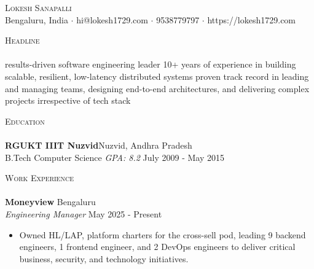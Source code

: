 \documentclass[10pt,a4paper]{article}
\newcommand{\lineunder} {
    \vspace*{-8pt} \\
    \hspace*{-18pt} \hrulefill \\
}
\newcommand{\header} [1] {
    {\hspace*{-18pt}\vspace*{6pt} \textsc{#1}}
    \vspace*{-6pt} \lineunder
}
\begin{document}
\vspace*{-40pt}

    

\vspace*{-10pt}
\begin{center}
	{\Huge \scshape {Lokesh Sanapalli}}\\
	Bengaluru, India $\cdot$ hi@lokesh1729.com $\cdot$ 9538779797 $\cdot$ https://lokesh1729.com\\
\end{center}

\header{Headline}
results-driven software engineering leader \textbar{} 10+ years of experience in building scalable, resilient, low-latency distributed systems \textbar{} proven track record in leading and managing teams, designing end-to-end architectures, and delivering complex projects irrespective of tech stack\\
\vspace*{2mm}

\header{Education}
\textbf{RGUKT IIIT Nuzvid}\hfill Nuzvid, Andhra Pradesh\\
B.Tech Computer Science \textit{GPA: 8.2} \hfill July 2009 - May 2015\\
\vspace{2mm}

\header{Work Experience}
\vspace{1mm}
\textbf{Moneyview} \hfill Bengaluru\\
\textit{Engineering Manager} \hfill May 2025 - Present\\
\vspace{-1mm}
\begin{itemize} \itemsep 1pt
    \item Owned HL/LAP, platform charters for the cross-sell pod, leading 9 backend engineers, 1 frontend engineer, and 2 DevOps engineers to deliver critical business, security, and technology initiatives.
\end{itemize}
\end{document}
